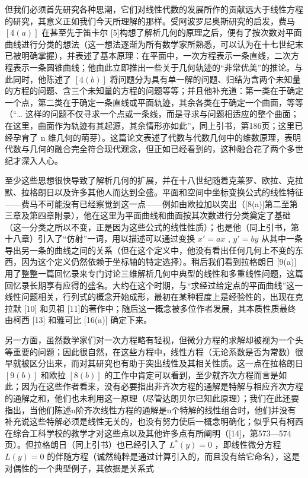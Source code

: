 但我们必须首先研究各种思潮，它们对线性代数的发展所作的贡献远大于线性方程的研究，其意义正如我们今天所理解的那样。受阿波罗尼奥斯研究的启发，费马 \([4(a)]\) 在甚至先于笛卡尔 {[}5{]}构想了解析几何的原理之后，便有了按次数对平面曲线进行分类的想法（这一想法逐渐为所有数学家所熟悉，可以认为在十七世纪末已被明确掌握），并表述了基本原理：在平面中，一次方程表示一条直线，二次方程表示一条圆锥曲线；他由此立即推出一些关于几何轨迹的“非常优美”的推论。与此同时，他陈述了 \([4(b)]\) 将问题分为具有单一解的问题、归结为含两个未知量的方程的问题、含三个未知量的方程的问题等等；并且他补充道：第一类在于确定一个点，第二类在于确定一条直线或平面轨迹，其余各类在于确定一个曲面，等等（“\ldots{} 这样的问题不仅寻求一个点或一条线，而是寻求与问题相适应的整个曲面；在这里，曲面作为轨迹有其起源，其余情形亦如此”，同上引书，第186页；这里已经孕育了 n 维几何的萌芽）。这篇论文表述了代数与代数几何中的维数原理，表明代数与几何的融合完全符合现代观念，但正如已经看到的，这种融合花了两个多世纪才深入人心。

至少这些思想很快导致了解析几何的扩展，并在十八世纪随着克莱罗、欧拉、克拉默、拉格朗日以及许多其他人而达到全盛。平面和空间中坐标变换公式的线性特征——费马不可能没有已经察觉到这一点——例如由欧拉加以突出（{[}8(a){]}第二至第三章及第四章附录），他在这里为平面曲线和曲面按其次数进行分类奠定了基础（这一分类之所以不变，正是因为这些公式的线性性质）；也是他（同上引书，第十八章）引入了“仿射”一词，用以描述可以通过变换 \(x' = ax\) , \(y' = by\) 从其中一条导出另一条的曲线之间的关系（但在这个定义中，他没有看出任何几何上不变的东西，因为这个定义仍然依赖于坐标轴的特定选择）。稍后我们看到拉格朗日 {[}9(a){]} 用了整整一篇回忆录来专门讨论三维解析几何中典型的线性和多重线性问题，这篇回忆录长期享有应得的盛名。大约在这个时期，与“求经过给定点的平面曲线”这一线性问题相关，行列式的概念开始成形，最初在某种程度上是经验性的，出现在克拉默 {[}10{]} 和贝祖 {[}11{]}的著作中；随后这一概念被多位作者发展，其本质性质最终由柯西 {[}13{]} 和雅可比 {[}16(a){]} 确定下来。

另一方面，虽然数学家们对一次方程略有轻视，但微分方程的求解却被视为一个头等重要的问题；因此很自然，在这些方程中，线性方程（无论系数是否为常数）很早就被区分出来，而对其研究也有助于突出线性及其相关性质。这一点在拉格朗日 \([9(b)]\) 和欧拉 \([8(b)]\) 的工作中肯定可以看到，至少就齐次方程而言是如此；因为在这些作者看来，没有必要指出非齐次方程的通解是特解与相应齐次方程的通解之和，他们也未利用这一原理（尽管达朗贝尔已知此原理）；我们在此还要指出，当他们陈述n阶齐次线性方程的通解是n个特解的线性组合时，他们并没有补充说这些特解必须是线性无关的，也没有努力使后一概念明确化；似乎只有柯西在综合工科学校的教学才对这些点以及其他许多点有所阐明（{[}14{]}，第573—574页）。但拉格朗日（同上引书）也已经引入了 \(L^{*}(y)=0\) ，即线性微分方程 \(L(y)=0\) 的伴随方程（诚然纯粹是通过计算引入的，而且没有给它命名），这是对偶性的一个典型例子，其依据是关系式

